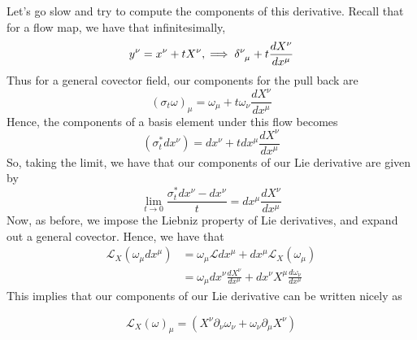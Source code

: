 \documentclass[11pt, a4paper]{article}   	%
\theoremstyle{slplain}
\begin{document}
Let's go slow and try to compute 
the components of this derivative. 
Recall that for a flow map, we have that infinitesimally, 
\[
y^\nu  = x^\nu  + t X^\nu , \implies \delta \indices{^\nu _\mu  } + t \frac{dX^\nu }{dx^\mu  }	  
\] Thus for a general covector field, our components for the pull back 
are 
\[
( \sigma_t \omega )_\mu  = \omega_\mu  + t \omega_\nu \frac{dX^\nu }{dx^\mu  }
\] Hence, the components of a basis element under this flow becomes 
\[
( \sigma_t^* dx^\nu )  = dx^ \nu  + t dx^\mu  \frac{dX^\nu  }{dx^\mu  }
\] So, taking the limit, we have that our components of our 
Lie derivative are given by 
\[
\lim_{t \to 0  } \frac{\sigma^*_t dx^\nu   - dx^\nu  }{ t }  = dx^\mu  \frac{dX^\nu }{dx^\mu  }		 
\] Now, as before, we impose the 
Liebniz property of Lie derivatives, and expand out a general covector. 
Hence, we have that 
\begin{align*}
\mathcal{L}_X( \omega_\mu  dx^\mu  ) &= \omega_\mu  \mathcal{L}dx^\mu  + dx^\mu  \mathcal{L}_X( \omega_\mu  )  \\
 &= \omega_\mu  dx^ \nu  \frac{dX^\nu  }{dx^\mu  } + dx^ \nu  X^\mu   \frac{d \omega_\nu }{dx^ \mu  }
\end{align*} This implies that 
our components of our Lie derivative can be written nicely as 


\[
\mathcal{L }_X( \omega )_\mu   = ( X^\nu \partial_\nu \omega _\nu + \omega _\nu \partial_\mu X^\nu ) 
\]  
\end{document}
